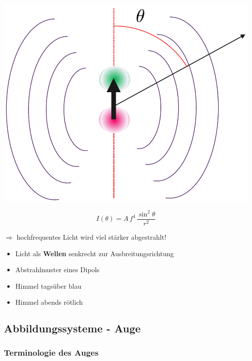 \begin{minipage}{0.38\linewidth}
\includegraphics[width=0.9\linewidth]{Bilder/Wellen-Optik/rayleigh_streuung}
\end{minipage}
\hfill
\begin{minipage}{0.58\linewidth}
$$ \boxed{ I(\theta) = A \, f^4 \, \frac{\sin^2 \theta}{r^2} } $$

$\Rightarrow$ hochfrequentes Licht wird viel stärker abgestrahlt! \\

\begin{itemize}

\item Licht als \textbf{Wellen} senkrecht 
	zur Ausbreitungsrichtung 
\item Abstrahlmuster eines Dipols \\
\item Himmel tagsüber blau 
\item Himmel abends rötlich	  

\end{itemize}

\end{minipage}


\subsection{Abbildungssysteme - Auge}

\subsubsection{Terminologie des Auges}


